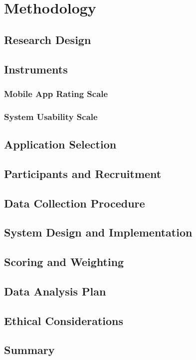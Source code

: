 \chapter{Methodology}

\section{Research Design}

\section{Instruments}

\subsection{Mobile App Rating Scale}

\subsection{System Usability Scale}

\section{Application Selection}

\section{Participants and Recruitment}

\section{Data Collection Procedure}

\section{System Design and Implementation}

\section{Scoring and Weighting}

\section{Data Analysis Plan}

\section{Ethical Considerations}

\section{Summary}
